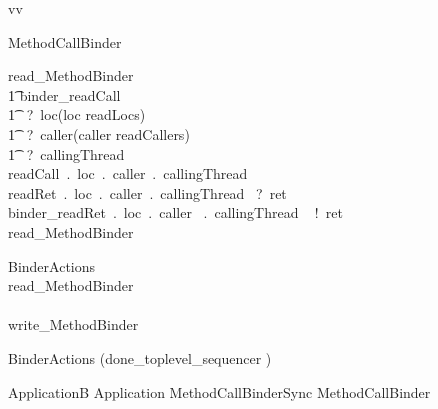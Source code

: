 vv

\begin{circus}
\circprocess  MethodCallBinder \circdef \circbegin \\
\end{circus}
%
%
\begin{circusaction}
read\_MethodBinder \circdef \\
	\t1 \circblockopen
	binder\_readCall\\
	\t1 ~?~loc\prefixcolon(loc \in readLocs)\\
	\t1 ~?~caller\prefixcolon(caller \in readCallers) 
	 \\ \t1 ~?~callingThread  \then \\
	readCall~.~loc~.~caller~.~callingThread   \then \\
	readRet~.~loc~.~caller~.~callingThread ~?~ret \then \\
	binder\_readRet~.~loc~.~caller  ~.~callingThread ~ !~ret  \then \\
	read\_MethodBinder
	\circblockclose
\end{circusaction}
%
%
%
%
\begin{circus}
BinderActions \circdef \\
\circblockopen 
	read\_MethodBinder
	\\ \interleave \\

	write\_MethodBinder
	
\circblockclose
\end{circus}
%
\begin{circus}
\circspot BinderActions \circinterrupt (done\_toplevel\_sequencer \then \Skip)
\end{circus}
%
\begin{circus}
\circend
\end{circus}
%
\begin{circus}
\circprocess ApplicationB \circdef Application \lpar MethodCallBinderSync \rpar MethodCallBinder
\end{circus}
